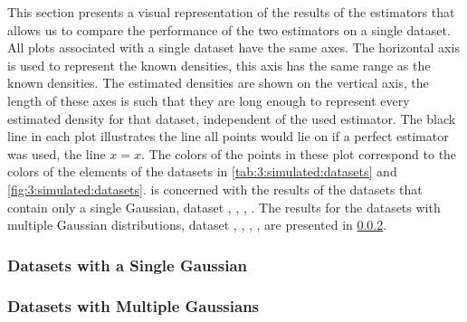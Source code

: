 This section presents a visual representation of the results of the estimators that allows us to compare the performance of the two estimators on a single dataset. All plots associated with a single dataset have the same axes. The horizontal axis is used to represent the known densities, this axis has the same range as the known densities. The estimated densities are shown on the vertical axis, the length of these axes is such that they are long enough to represent every estimated density for that dataset, independent of the used estimator. The black line in each plot illustrates the line all points would lie on if a perfect estimator was used, \ie the line $x = x$. The colors of the points in these plot correspond to the colors of the elements of the datasets in \cref{tab:3:simulated:datasets} and \cref{fig:3:simulated:datasets}.  is concerned with the results of the datasets that contain only a single Gaussian, \ie dataset \ferdosiOne, \baakmanOne, \baakmanFour, \baakmanFive. The results for the datasets with multiple Gaussian distributions, \ie dataset \ferdosiTwo, \baakmanTwo, \ferdosiThree, \baakmanThree, are presented in \cref{s:results:plots:multipleGaussians}.

\subsubsection{Datasets with a Single Gaussian}
	\label{s:results:plots:singleGaussian}


\subsubsection{Datasets with Multiple Gaussians}
	\label{s:results:plots:multipleGaussians}



